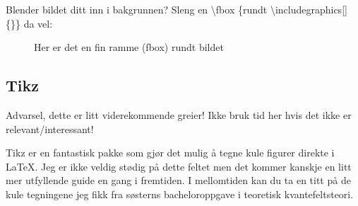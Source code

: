         Blender bildet ditt inn i bakgrunnen? Sleng en \textbackslash fbox \{rundt \textbackslash includegraphics[]\{\}\} da vel:
        
        \begin{figure}[H]
            \centering 
            \caption{Her er det en fin ramme (fbox) rundt bildet}
            \label{fig:bordered_img}
        \end{figure}
        
        
        
    \subsection{Tikz}
        Advarsel, dette er litt viderekommende greier! Ikke bruk tid her hvis det ikke er relevant/interessant! 
        
        Tikz er en fantastisk pakke som gjør det mulig å tegne kule figurer direkte i \LaTeX. Jeg er ikke veldig stødig på dette feltet men det kommer kanskje en litt mer utfyllende guide en gang i fremtiden. I mellomtiden kan du ta en titt på de kule tegningene jeg fikk fra søsterns bacheloroppgave i teoretisk kvantefeltsteori. 

